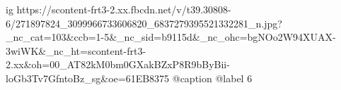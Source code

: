  
 
 
 
 

\ifcmt
  ig https://scontent-frt3-2.xx.fbcdn.net/v/t39.30808-6/271897824_3099966733606820_6837279395521332281_n.jpg?_nc_cat=103&ccb=1-5&_nc_sid=b9115d&_nc_ohc=bgNOo2W94XUAX-3wiWK&_nc_ht=scontent-frt3-2.xx&oh=00_AT82kM0bm0GXakBZxP8R9bByBii-loGb3Tv7GfntoBz_sg&oe=61EB8375
  @caption @label 6
\fi
